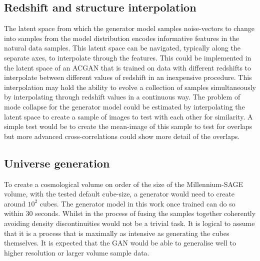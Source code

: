 \documentclass[twocolumn]{article}
\numberwithin{equation}{section}
\begin{document}

\subsection{Redshift and structure interpolation} 
The latent space from which the generator model samples noise-vectors to change into samples from the model distribution 
encodes informative features in the natural data samples. This latent space can be navigated, typically along the separate 
axes, to interpolate through the features. This could be implemented in the latent space of an ACGAN that is trained on 
data with different redshifts to interpolate between different values of redshift in an inexpensive procedure. This 
interpolation may hold the ability to evolve a collection of samples simultaneously by interpolating through redshift 
values in a continuous way. The problem of mode collapse for the generator model could be estimated by interpolating the 
latent space to create a sample of images to test with each other for similarity. A simple test would be to create the 
mean-image of this sample to test for overlaps but more advanced cross-correlations could show more detail of the overlaps.  


\subsection{Universe generation} 
To create a cosmological volume on order of the size of the Millennium-SAGE volume, with the tested default cube-size, a 
generator would need to create around $10^2$ cubes. The generator model in this work once trained can do so within 30 
seconds. Whilst in the process of fusing the samples together coherently avoiding density discontinuities would not be a 
trivial task. It is logical to assume that it is a process that is maximally as intensive as generating the cubes 
themselves. It is expected that the GAN would be able to generalise well to higher resolution or larger volume sample data.  
\end{document}
